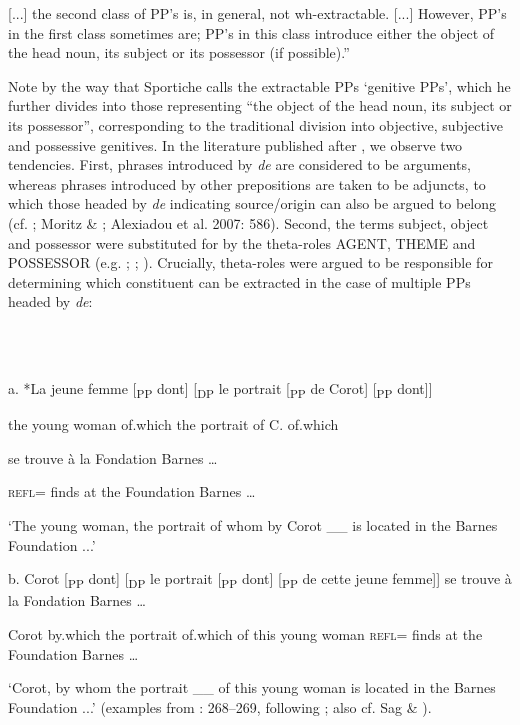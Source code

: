 \documentclass[output=paper]{langsci/langscibook}
\begin{document}
[...] the second class of PP’s is, in general, not wh-extractable. [...] However, PP’s in the first class sometimes are; PP’s in this class introduce either the object of the head noun, its subject or its possessor (if possible).” \citep[225]{Sportiche1981}

Note by the way that Sportiche calls the extractable PPs ‘genitive PPs’, which he further divides into those representing “the object of the head noun, its subject or its possessor”, corresponding to the traditional division into objective, subjective and possessive genitives. In the literature published after \citet{Sportiche1981}, we observe two tendencies. First, phrases introduced by \textit{de} are considered to be arguments, whereas phrases introduced by other prepositions are taken to be adjuncts, to which those headed by \textit{de} indicating source/origin can also be argued to belong (cf. \citealt{Cinque1990}; Moritz \& \citealt{Valois1994}; Alexiadou et al. 2007: 586). Second, the terms subject, object and possessor were substituted for by the theta-roles AGENT, THEME and POSSESSOR (e.g. \citealt{Pollock1989}; \citealt{Valois1991}; \citealt{Godard1992}). Crucially, theta-roles were argued to be responsible for determining which constituent can be extracted in the case of multiple PPs headed by \textit{de}:

\ea%
    \label{ex:key:9}
    \gll\\
        \\
    \glt
    \z

          a.  *La  jeune  femme   [\textsubscript{PP} dont] [\textsubscript{DP}  le  portrait [\textsubscript{PP} de Corot] [\textsubscript{PP} dont]]  

      the  young  woman  of.which  the portrait  of C.    of.which

    se  trouve  à  la  Fondation Barnes …

    \textsc{refl}=  finds  at  the  Foundation Barnes …

‘The young woman, the portrait of whom by Corot \_\_ is located in the Barnes Foundation ...’

  b.  Corot [\textsubscript{PP} dont]  [\textsubscript{DP}  le portrait  [\textsubscript{PP} dont] [\textsubscript{PP}  de cette  jeune        femme]]  se  trouve  à  la  Fondation Barnes …  

    Corot by.which    the portrait  of.which        of this  young        woman  \textsc{refl}=  finds  at  the  Foundation Barnes …

‘Corot, by whom the portrait \_\_ of this young woman is located in the Barnes Foundation ...’ (examples from \citealt{Godard1992}: 268–269, following \citealt{Ruwet1972}; also cf. Sag \& \citealt{Godard1994}).
\end{document}
